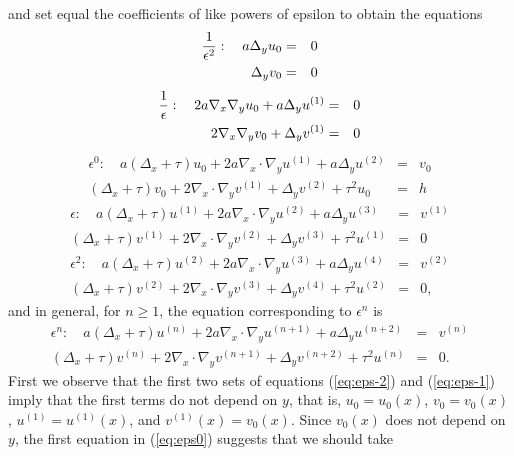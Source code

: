 \documentclass[10pt,a4paper]{amsart}
\begin{document}
and set equal the coefficients of like powers of epsilon to obtain the equations
\begin{eqnarray}\label{eq:eps-2} {1\over{\epsilon^2}}: \quad  a\Delta_y u_0 &=& 0 \\ \Delta_y v_0 &=& 0 \nonumber\end{eqnarray}
\begin{eqnarray}\label{eq:eps-1} {1\over{\epsilon}}: \quad  2a \nabla_x \nabla_y u_0 +  a \Delta_y u^{(1)} &=& 0 \\ 2\nabla_x \nabla_y v_0 + \Delta_y v^{(1)} &=& 0 \nonumber \end{eqnarray}
\begin{eqnarray}\label{eq:eps0} {\epsilon^0}:  \quad  a(\Delta_x+\tau)u_0 + 2a \nabla_x\cdot \nabla_y u^{(1)}+  a \Delta_y u^{(2)} &=& v_0 \\  (\Delta_x+\tau)v_0 + 2\nabla_x\cdot \nabla_y v^{(1)} + \Delta_y v^{(2)} +\tau^2 u_0 &=& h\nonumber \end{eqnarray}
\begin{eqnarray}\label{eq:eps1} {\epsilon}:  \quad  a(\Delta_x+\tau)u^{(1)} + 2a \nabla_x\cdot \nabla_y u^{(2)}+  a \Delta_y u^{(3)} &=& v^{(1)} \\  (\Delta_x+\tau)v^{(1)} + 2\nabla_x\cdot \nabla_y v^{(2)} + \Delta_y v^{(3)} +\tau^2 u^{(1)} &=& 0\nonumber \end{eqnarray}
\begin{eqnarray}\label{eq:eps2} {\epsilon^2}:  \quad  a(\Delta_x+\tau)u^{(2)} + 2a \nabla_x\cdot \nabla_y u^{(3)}+  a \Delta_y u^{(4)} &=& v^{(2)} \\  (\Delta_x+\tau)v^{(2)} + 2\nabla_x\cdot \nabla_y v^{(3)} + \Delta_y v^{(4)} +\tau^2 u^{(2)} &=& 0,\nonumber\end{eqnarray}
and in general, for $n\geq 1$, the equation corresponding to $\epsilon^n$ is 
\begin{eqnarray}\label{eq:epsn} {\epsilon^n}:  \quad  a(\Delta_x+\tau)u^{(n)} + 2a \nabla_x\cdot \nabla_y u^{(n+1)}+  a \Delta_y u^{(n+2)} &=& v^{(n)} \\  (\Delta_x+\tau)v^{(n)} + 2\nabla_x\cdot \nabla_y v^{(n+1)} + \Delta_y v^{(n+2)} +\tau^2 u^{(n)} &=& 0.\nonumber\end{eqnarray}
First we observe that the first two sets of equations (\ref{eq:eps-2}) and (\ref{eq:eps-1}) imply that the first terms do not depend on $y$, that is, $u_0 =u_0(x)$, $v_0=v_0(x)$, $u^{(1)} =u^{(1)}(x)$, and $v^{(1)}(x)=v_0(x)$. Since $v_0(x)$ does not depend on $y$, the first equation in  (\ref{eq:eps0}) suggests that we should take 
\end{document}
